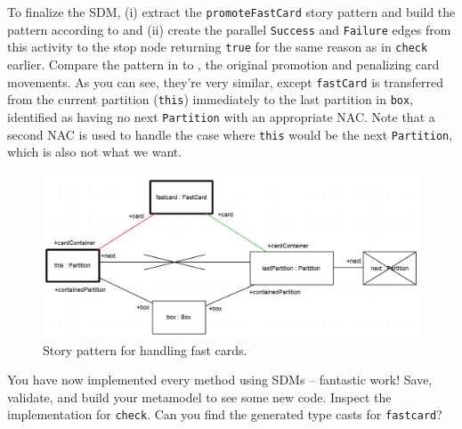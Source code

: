 \begin{stepbystep}
\item To finalize the SDM, (i) extract the \texttt{promoteFastCard} story pattern and build the pattern according to
 and (ii) create the parallel \texttt{Success} and \texttt{Failure} edges from this activity to the stop node returning 
\texttt{true} for the same reason as in \texttt{check} earlier.
Compare the pattern in  to , the original promotion and penalizing card movements.
As you can see, they're very similar, except \texttt{fastCard} is transferred from the current partition
(\texttt{this}) immediately to the last partition in \texttt{box}, identified as having no next \texttt{Partition} with an appropriate NAC.
Note that a second NAC is used to handle the case where \texttt{this} would be the next \texttt{Partition}, which is also not what we want.

\begin{figure}[htbp] 
\begin{center}
  \includegraphics[width=\textwidth]{../../org.moflon.doc.handbook.03_storyDiagrams/11_fastCards/visFCImages/ea_promoteFastCardPattern}
  \caption{Story pattern for handling fast cards.}  
  \label{ea:promoteFastCardPattern}
\end{center}
\end{figure}

\item You have now implemented every method using SDMs -- fantastic work! Save, validate, and build your metamodel to see some new code.
Inspect the implementation for \texttt{check}.  Can you find the generated type casts for \texttt{fastcard}?

\end{stepbystep}

